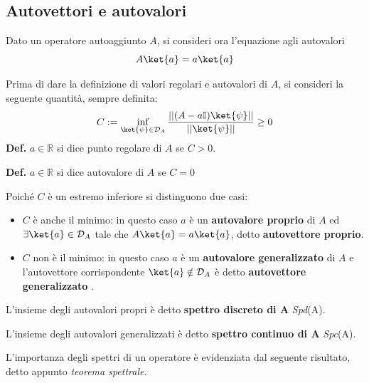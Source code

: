 \newpage
\subsection{Autovettori e autovalori}

Dato un operatore autoaggiunto $ A $, si consideri ora l'equazione agli autovalori
$$ A\ket{a} = a\ket{a} $$ 

Prima di dare la definizione di valori regolari e autovalori di $ A $, si consideri la seguente
quantità, sempre definita:
$$ C := \inf\limits_{\ket{\psi}\in\mathcal{D}_A}\frac{||(A-a\mathbb{I})\ket{\psi}||}{||\ket{\psi}||}\geq 0$$ 
\textbf{Def.} $a\in\mathbb{R}$ si dice punto regolare di $ A $ se $ C > 0 $.

\textbf{Def.} $a\in\mathbb{R}$ si dice autovalore di $ A $ se $C=0$

Poiché $ C $ è un estremo inferiore si distinguono due casi:
\begin{itemize}
    \item $ C $ è anche il minimo: in questo caso $ a $ è un \textbf{autovalore proprio} di $ A $
	ed $ \exists \ket{a}\in\mathcal{D}_A $ tale che $ A\ket{a} = a\ket{a}$, detto
	\textbf{autovettore proprio}.
    \item $ C $ non è il minimo: in questo caso $ a $ è un \textbf{autovalore generalizzato} di 
	$ A $ e l'autovettore corrispondente $ \ket{a}\notin\mathcal{D}_A $ è detto
	\textbf{autovettore generalizzato} . 
\end{itemize}

L'insieme degli	autovalori propri è detto \textbf{spettro discreto di A} \textit{Spd}(A).

L'insieme degli autovalori generalizzati è detto \textbf{spettro continuo di A} \textit{Spc}(A).

L'importanza degli spettri di un operatore è evidenziata dal seguente risultato, detto appunto
\textit{teorema spettrale}.

